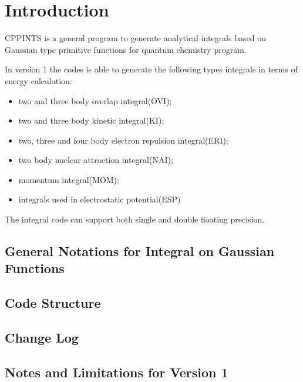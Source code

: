%
% 
%
\chapter{Introduction}

CPPINTS is a general program to generate analytical integrals based on Gaussian type primitive 
functions for quantum chemistry program.

In version 1 the codes is able to generate the following types integrals in terms of energy 
calculation:
\begin{itemize}
 \item two and three body overlap integral(OVI);
 \item two and three body kinetic integral(KI);
 \item two, three and four body electron repulsion integral(ERI);
 \item two body nuclear attraction integral(NAI);
 \item momentum integral(MOM);
 \item integrals used in electrostatic potential(ESP)
\end{itemize}

The integral code can support both single and double floating precision.

\section{General Notations for Integral on Gaussian Functions}

\section{Code Structure}

\section{Change Log}

\section{Notes and Limitations for Version 1}
\label{v1_notes_limits}

